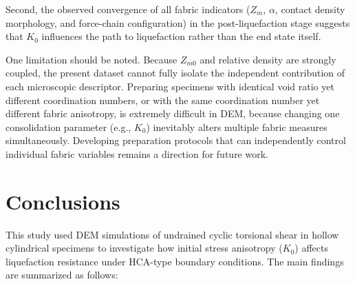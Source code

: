 \documentclass[a4paper,fleqn]{cas-sc}
\newcommand{\Kzero}{\ensuremath{K_0}}
\newcommand{\Zm}{\ensuremath{Z_m}}
\begin{document}
Second, the observed convergence of all fabric indicators (\Zm{}, $\alpha$, contact density morphology, and force-chain configuration) in the post-liquefaction stage suggests that \Kzero{} influences the path to liquefaction rather than the end state itself.

One limitation should be noted. Because $Z_{m0}$ and relative density are strongly coupled, the present dataset cannot fully isolate the independent contribution of each microscopic descriptor. Preparing specimens with identical void ratio yet different coordination numbers, or with the same coordination number yet different fabric anisotropy, is extremely difficult in DEM, because changing one consolidation parameter (e.g., \Kzero{}) inevitably alters multiple fabric measures simultaneously. Developing preparation protocols that can independently control individual fabric variables remains a direction for future work.
 \section{Conclusions}
\label{sec:conclusions}

This study used DEM simulations of undrained cyclic torsional shear in hollow cylindrical specimens to investigate how initial stress anisotropy (\Kzero{}) affects liquefaction resistance under HCA-type boundary conditions. The main findings are summarized as follows:
\end{document}
